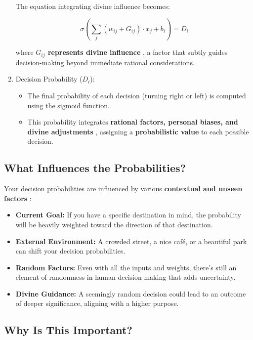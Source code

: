 \documentclass{article}
\begin{document}
\begin{enumerate}[1.]
The equation integrating divine influence becomes:

$$
\sigma \left(\sum_{j} (w_{ij} + G_{ij}) \cdot x_j + b_i \right) = D_i
$$

where {\bf $G_{ij}$ represents divine influence} , a factor that subtly guides decision-making beyond immediate rational considerations.

\item   Decision Probability ($D_i$):

\begin{itemize}
\item  The final probability of each decision (turning right or left) is computed using the sigmoid function.
\item  This probability integrates {\bf rational factors, personal biases, and divine adjustments} , assigning a {\bf probabilistic value}  to each possible decision.
   
\end{itemize}
\end{enumerate}


\subsection*{What Influences the Probabilities?}

Your decision probabilities are influenced by various {\bf contextual and unseen factors} :

\begin{itemize}
\item   {\bf Current Goal:}  If you have a specific destination in mind, the probability will be heavily weighted toward the direction of that destination.
\item   {\bf External Environment:}  A crowded street, a nice café, or a beautiful park can shift your decision probabilities.
\item    {\bf Random Factors:}  Even with all the inputs and weights, there's still an element of randomness in human decision-making that adds uncertainty.
\item    {\bf Divine Guidance:}  A seemingly random decision could lead to an outcome of deeper significance, aligning with a higher purpose.
\end{itemize}


\subsection*{Why Is This Important?}
\end{document}
